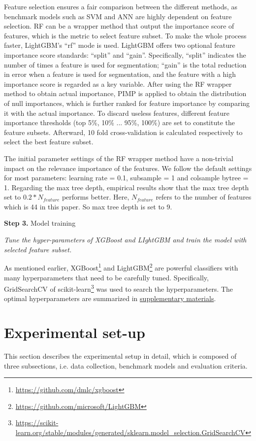 \documentclass[review]{elsarticle}
\begin{document}
Feature selection ensures a fair comparison between the different methods, as benchmark models such as SVM and ANN are highly dependent on feature selection. RF can be a wrapper method that output the importance score of features, which is the metric to select feature subset. To make the whole process faster, LightGBM's ``rf'' mode is used. LightGBM offers two optional feature importance score standards: ``split'' and ``gain''. Specifically, ``split'' indicates the number of times a feature is used for segmentation; ``gain'' is the total reduction in error when a feature is used for segmentation, and the feature with a high importance score is regarded as a key variable. After using the RF wrapper method to obtain actual importance, PIMP is applied to obtain the distribution of null importances, which is further ranked for feature importance by comparing it with the actual importance. To discard useless features, different feature importance thresholds (top 5\%, 10\% ... 95\%, 100\%) are set to constitute the feature subsets. Afterward, 10 fold cross-validation is calculated respectively to select the best feature subset.

The initial parameter settings of the RF wrapper method have a non-trivial impact on the relevance importance of the features. We follow the default settings for most parameters: learning rate = 0.1, subsample = 1 and colsample bytree = 1. Regarding the max tree depth, empirical results show that the max tree depth set to $0.2*N_{feature}$ performs better. Here, $N_{feature}$ refers to the number of features which is 44 in this paper. So max tree depth is set to 9.

\textbf{Step 3.} Model training

\textit{Tune the hyper-parameters of XGBoost and LIghtGBM and train the model with selected feature subset.}

As mentioned earlier, XGBoost\footnote{\url{https://github.com/dmlc/xgboost}} and LightGBM\footnote{\url{https://github.com/microsoft/LightGBM}} are powerful classifiers with many hyperparameters that need to be carefully tuned. Specifically, GridSearchCV of scikit-learn\footnote{\url{https://scikit-learn.org/stable/modules/generated/sklearn.model_selection.GridSearchCV}} was used to search the hyperparameters. The optimal hyperparameters are summarized in \hyperref[supplementary_materials]{supplementary materials}.

\section{Experimental set-up}
\label{section_4}
This section describes the experimental setup in detail, which is composed of three subsections, i.e. data collection, benchmark models and evaluation criteria.
\end{document}
